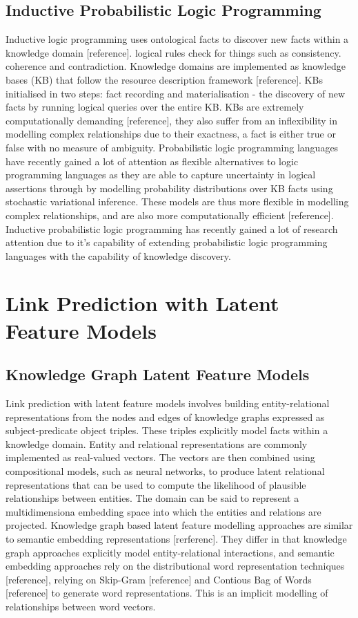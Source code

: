 \subsection{Inductive Probabilistic Logic Programming}  %
Inductive logic programming uses ontological facts to discover new facts within a knowledge domain [reference]. logical rules check for things such as consistency. coherence and contradiction. Knowledge domains are implemented as knowledge bases (KB) that follow the resource description framework [reference]. KBs initialised in two steps: fact recording and materialisation - the discovery of new facts by running logical queries over the entire KB. KBs are extremely computationally demanding [reference], they also suffer from an inflexibility in modelling complex relationships due to their exactness, a fact is either true or false with no measure of ambiguity. Probabilistic logic programming languages have recently gained a lot of attention as flexible alternatives to logic programming languages as they are able to capture uncertainty in logical assertions through by modelling probability distributions over KB facts using stochastic variational inference. These models are thus more flexible in modelling complex relationships, and are also more computationally efficient [reference]. Inductive probabilistic logic programming has recently gained a lot of research attention due to it's capability of extending probabilistic logic programming languages with the capability of knowledge discovery. 

\section{Link Prediction with Latent Feature Models}  %
\label{section1.3}
\subsection{Knowledge Graph Latent Feature Models}
Link prediction with latent feature models involves building entity-relational representations from the nodes and edges of knowledge graphs expressed as subject-predicate object triples. These triples explicitly model facts within a knowledge domain. Entity and relational representations are commonly implemented as real-valued vectors. The vectors are then combined using compositional models, such as neural networks, to produce latent relational representations that can be used to compute the likelihood of plausible relationships between entities. The domain can be said to represent a multidimensiona embedding space into which the entities and relations are projected. Knowledge graph based latent feature modelling approaches are similar to semantic embedding representations [rerferenc]. They differ in that knowledge graph approaches explicitly model entity-relational interactions,  and semantic embedding approaches rely on the distributional word representation techniques [reference], relying on Skip-Gram [reference] and Contious Bag of Words [reference] to generate word representations. This is an implicit modelling of relationships between word vectors. \newline

